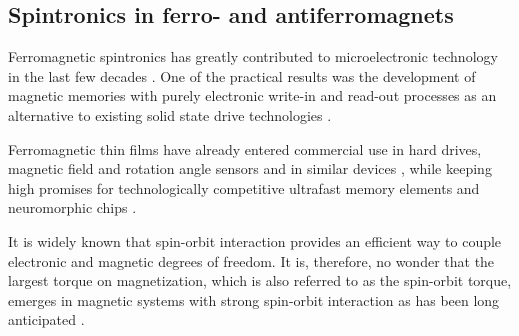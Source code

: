 
\subsection{Spintronics in ferro- and antiferromagnets}
Ferromagnetic spintronics has greatly contributed to microelectronic technology in the last few decades \cite{bader_spintronics_2010, sinova_new_2012, bhatti_spintronics_2017}. One of the practical results was the development of magnetic memories with purely electronic write-in and read-out processes as an alternative to existing solid state drive technologies \cite{kent_new_2015, sato_two-terminal_2018}.

Ferromagnetic thin films have already entered commercial use in hard drives, magnetic field and rotation angle sensors and in similar devices \cite{Parkin2003,Jogschies2015,Novoselov2019}, while keeping high promises for technologically competitive ultrafast memory elements \cite{Lau2016} and neuromorphic chips \cite{Fukami2016}. 

It is widely known that spin-orbit interaction provides an efficient way to couple electronic and magnetic degrees of freedom. It is, therefore, no wonder that the largest torque on magnetization, which is also referred to as the spin-orbit torque, emerges in magnetic systems with strong spin-orbit interaction \cite{miron_current-driven_2010,haney_current_2013} as has been long anticipated \cite{dyakonov_current-induced_1971}. 

